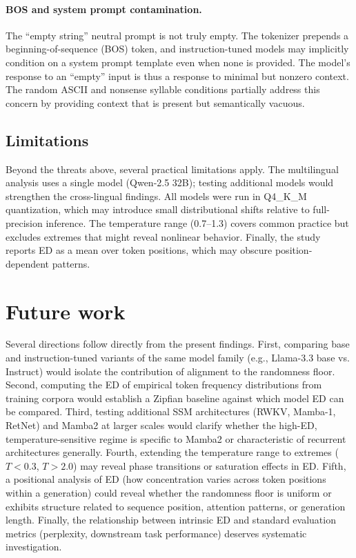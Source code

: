 \documentclass{article}
\begin{document}
\paragraph{BOS and system prompt contamination.}
The ``empty string'' neutral prompt is not truly empty. The tokenizer prepends a beginning-of-sequence (BOS) token, and instruction-tuned models may implicitly condition on a system prompt template even when none is provided. The model's response to an ``empty'' input is thus a response to minimal but nonzero context. The random ASCII and nonsense syllable conditions partially address this concern by providing context that is present but semantically vacuous.

\subsection{Limitations}

Beyond the threats above, several practical limitations apply. The multilingual analysis uses a single model (Qwen-2.5 32B); testing additional models would strengthen the cross-lingual findings. All models were run in Q4\_K\_M quantization, which may introduce small distributional shifts relative to full-precision inference. The temperature range (0.7--1.3) covers common practice but excludes extremes that might reveal nonlinear behavior. Finally, the study reports ED as a mean over token positions, which may obscure position-dependent patterns.

\section{Future work}
\label{sec:future}

Several directions follow directly from the present findings. First, comparing base and instruction-tuned variants of the same model family (e.g., Llama-3.3 base vs. Instruct) would isolate the contribution of alignment to the randomness floor. Second, computing the ED of empirical token frequency distributions from training corpora would establish a Zipfian baseline against which model ED can be compared. Third, testing additional SSM architectures (RWKV, Mamba-1, RetNet) and Mamba2 at larger scales would clarify whether the high-ED, temperature-sensitive regime is specific to Mamba2 or characteristic of recurrent architectures generally. Fourth, extending the temperature range to extremes ($T < 0.3$, $T > 2.0$) may reveal phase transitions or saturation effects in ED. Fifth, a positional analysis of ED (how concentration varies across token positions within a generation) could reveal whether the randomness floor is uniform or exhibits structure related to sequence position, attention patterns, or generation length. Finally, the relationship between intrinsic ED and standard evaluation metrics (perplexity, downstream task performance) deserves systematic investigation.
\end{document}
